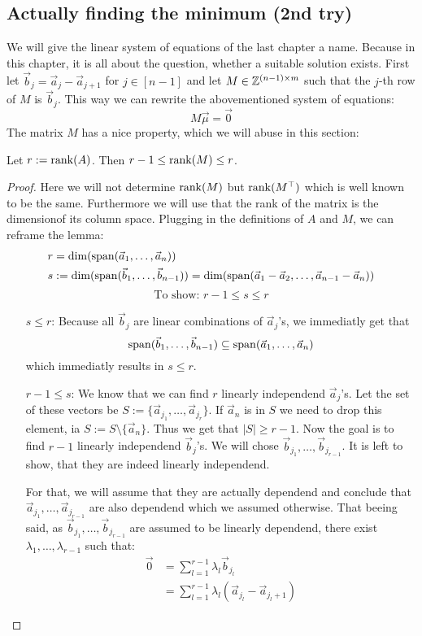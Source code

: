\subsection{Actually finding the minimum (2nd try)}
We will give the linear system of equations of the last chapter a name. Because in this chapter, it is all about the question, whether a suitable solution exists. First let $\vec b_j = \vec a_j - \vec a_{j+1}$ for $j \in [n-1]$ and let $M \in \mathbb{Z}^{(n-1) \times m}$ such that the $j$-th row of $M$ is $\vec b_j$. This way we can rewrite the abovementioned system of equations:
$$M\vec\mu = \vec0$$
The matrix $M$ has a nice property, which we will abuse in this section:
\begin{lemma}
    Let $r:= \operatorname{rank}(A)$. Then $r-1 \leq \operatorname{rank}(M) \leq r$.
\end{lemma}
\begin{proof}
    Here we will not determine $\operatorname{rank}(M)$ but $\operatorname{rank}(M^\top)$ which is well known to be the same. Furthermore we will use that the rank of the matrix is the dimensionof its column space. Plugging in the definitions of $A$ and $M$, we can reframe the lemma:
    \begin{align*}
        r &= \dim(\operatorname{span}(\vec a_1, \dots, \vec a_n))\\
        s &:= \dim(\operatorname{span}(\vec b_1, \dots, \vec b_{n-1})) = \dim(\operatorname{span}(\vec a_1 - \vec a_2, \dots, \vec a_{n-1} - \vec a_n))
    \end{align*}
    $$\textrm{To show: } r-1 \leq s \leq r$$
    \begin{enumerate}
        \item[$s\leq r$:] Because all $\vec b_j$ are linear combinations of $\vec a_j$'s, we immediatly get that
        $$\operatorname{span}(\vec b_1, \dots, \vec b_{n-1}) \subseteq \operatorname{span}(\vec a_1, \dots, \vec a_n)$$
        which immediatly results in $s\leq r$.
        \item[$r-1 \leq s$:] We know that we can find $r$ linearly independend $\vec a_j$'s. Let the set of these vectors be $S := \{\vec a_{j_1}, \dots, \vec a_{j_r}\}$. If $\vec a_n$ is in $S$ we need to drop this element, ia $S := S \setminus \{\vec a_n\}$. Thus we get that $|S| \geq r-1$. Now the goal is to find $r-1$ linearly independend $\vec b_j$'s. We will chose $\vec b_{j_1}, \dots, \vec b_{j_{r-1}}$. It is left to show, that they are indeed linearly independend.
        
        For that, we will assume that they are actually dependend and conclude that $\vec a_{j_1}, \dots, \vec a_{j_{r-1}}$ are also dependend which we assumed otherwise. That beeing said, as $\vec b_{j_1}, \dots, \vec b_{j_{r-1}}$ are assumed to be linearly dependend, there exist $\lambda_1, \dots, \lambda_{r-1}$ such that:
        \begin{align*}
            \vec0 &= \sum_{l=1}^{r-1}\lambda_{l}\vec b_{j_l}\\
            &= \sum_{l=1}^{r-1}\lambda_{l}(\vec a_{j_l} - \vec a_{j_l+1})
        \end{align*}


    \end{enumerate}
\end{proof}

